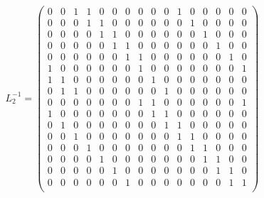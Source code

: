 \documentclass{transcrypto}
\begin{document}
\begin{appendices}
	\begin{equation*}
	L_2^{-1} = 
	\begin{pmatrix}
	0 & 0 & 1 & 1 & 0 & 0 & 0 & 0 & 0 & 0 & 1 & 0 & 0 & 0 & 0 & 0 \\ 
	0 & 0 & 0 & 1 & 1 & 0 & 0 & 0 & 0 & 0 & 0 & 1 & 0 & 0 & 0 & 0   \\ 
	0 & 0 & 0 & 0 & 1 & 1 & 0 & 0 & 0 & 0 & 0 & 0 & 1 & 0 & 0 & 0 \\ 
	0 & 0 & 0 & 0 & 0 & 1 & 1 & 0 & 0 & 0 & 0 & 0 & 0 & 1 & 0 & 0 \\ 
	0 & 0 & 0 & 0 & 0 & 0 & 1 & 1 & 0 & 0 & 0 & 0 & 0 & 0 & 1 & 0 \\ 
	1 & 0 & 0 & 0 & 0 & 0 & 0 & 1 & 0 & 0 & 0 & 0 & 0 & 0 & 0 & 1 \\ 
	1 & 1 & 0 & 0 & 0 & 0 & 0 & 0 & 1 & 0 & 0 & 0 & 0 & 0 & 0 & 0  \\ 
	0 & 1 & 1 & 0 & 0 & 0 & 0 & 0 & 0 & 1 & 0 & 0 & 0 & 0 & 0 & 0 \\ 
	0 & 0 & 0 & 0 & 0 & 0 & 0 & 1 & 1 & 0 & 0 & 0 & 0 & 0 & 0 & 1 \\ 
	1 & 0 & 0 & 0 & 0 & 0 & 0 & 0 & 1 & 1 & 0 & 0 & 0 & 0 & 0 & 0    \\ 
	0 & 1 & 0 & 0 & 0 & 0 & 0 & 0 & 0 & 1 & 1 & 0 & 0 & 0 & 0 & 0  \\ 
	0 & 0 & 1 & 0 & 0 & 0 & 0 & 0 & 0 & 0 & 1 & 1 & 0 & 0 & 0 & 0 \\ 
	0 & 0 & 0 & 1 & 0 & 0 & 0 & 0 & 0 & 0 & 0 & 1 & 1 & 0 & 0 & 0  \\ 
	0 & 0 & 0 & 0 & 1 & 0 & 0 & 0 & 0 & 0 & 0 & 0 & 1 & 1 & 0 & 0 \\ 
	0 & 0 & 0 & 0 & 0 & 1 & 0 & 0 & 0 & 0 & 0 & 0 & 0 & 1 & 1 & 0   \\ 
	0 & 0 & 0 & 0 & 0 & 0 & 1 & 0 & 0 & 0 & 0 & 0 & 0 & 0 & 1 & 1 \\ 
	\end{pmatrix}
	\end{equation*}
	

\end{appendices}
\end{document}
